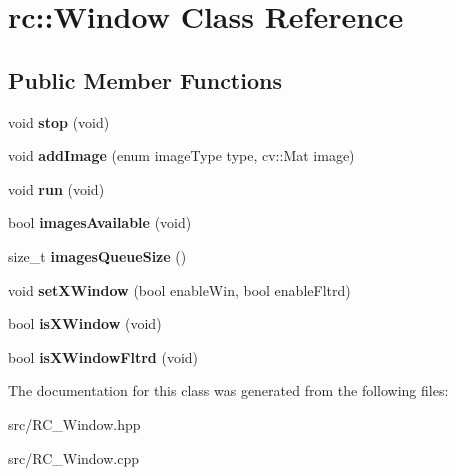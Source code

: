 \hypertarget{classrc_1_1Window}{\section{rc\+:\+:Window Class Reference}
\label{classrc_1_1Window}
}
\subsection*{Public Member Functions}
\begin{DoxyCompactItemize}
\item 
\hypertarget{classrc_1_1Window_a115530da5a987d8c241b0febc3cddc8f}{void {\bfseries stop} (void)}\label{classrc_1_1Window_a115530da5a987d8c241b0febc3cddc8f}

\item 
\hypertarget{classrc_1_1Window_aa34989ba0c08041b7e3bcc35125340ec}{void {\bfseries add\+Image} (enum image\+Type type, cv\+::\+Mat image)}\label{classrc_1_1Window_aa34989ba0c08041b7e3bcc35125340ec}

\item 
\hypertarget{classrc_1_1Window_a15681842c7ce0ee6b9201cfa973d2ac1}{void {\bfseries run} (void)}\label{classrc_1_1Window_a15681842c7ce0ee6b9201cfa973d2ac1}

\item 
\hypertarget{classrc_1_1Window_a7cb65cbb3741a7711631f66c46c7b039}{bool {\bfseries images\+Available} (void)}\label{classrc_1_1Window_a7cb65cbb3741a7711631f66c46c7b039}

\item 
\hypertarget{classrc_1_1Window_a3c221423c38f30757d042b2621f22894}{size\+\_\+t {\bfseries images\+Queue\+Size} ()}\label{classrc_1_1Window_a3c221423c38f30757d042b2621f22894}

\item 
\hypertarget{classrc_1_1Window_aac13c76846e47e026d66eaf4a52fcd57}{void {\bfseries set\+X\+Window} (bool enable\+Win, bool enable\+Fltrd)}\label{classrc_1_1Window_aac13c76846e47e026d66eaf4a52fcd57}

\item 
\hypertarget{classrc_1_1Window_abd9877b14cf84b02e7c6ea54c23bc082}{bool {\bfseries is\+X\+Window} (void)}\label{classrc_1_1Window_abd9877b14cf84b02e7c6ea54c23bc082}

\item 
\hypertarget{classrc_1_1Window_a01dcc54995ffd8c973423566b6734d44}{bool {\bfseries is\+X\+Window\+Fltrd} (void)}\label{classrc_1_1Window_a01dcc54995ffd8c973423566b6734d44}

\end{DoxyCompactItemize}


The documentation for this class was generated from the following files\+:\begin{DoxyCompactItemize}
\item 
src/R\+C\+\_\+\+Window.\+hpp\item 
src/R\+C\+\_\+\+Window.\+cpp\end{DoxyCompactItemize}
